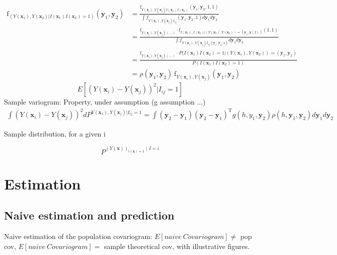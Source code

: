 \documentclass[12pt]{article}
\theoremstyle{definition}
\theoremstyle{remark}
\newcommand{\density}{\mathrm{f}}
\newcommand{\position}{\mathbf{x}}
\newcommand{\Signal}{Y}
\newcommand{\signal}{\mathbf{y}}
\begin{document}
\begin{equation}
\begin{split}
    \density_{(\Signal(\position_{1}),\Signal(\position_{2})|I(\position_1)I(\position_2)=1)}\left(\signal_1,\signal_2\right)&=\frac{\density_{Y(\position_{i}),\Signal(\position_{j})I(\position_1)I(\position_2)}(\signal_1,\signal_2,1,1)}{\int{f_{Y(\position_{i}),Y(\position_{j})I_{ij}}(\signal_{1},\signal_{2},1)}d \signal_{1}d \signal_{2}}\\
    &=\frac{\density_{\Signal(\position_{i}),\Signal(\position_{j})(\cdot,\cdot)}\cdot \density_{I(\position_1),I(\position_1)|(\Signal(\position_{1}),\Signal(\position_{2}))=(\signal_1,\signal(2))}(1,1)}{\int{f_{\Signal(\position_{i}),\Signal(\position_{j})I_{ij}(\signal_{1},\signal_{2},1)}d \signal_{1}d \signal_{2}}}\\
    &=\frac{\density_{\Signal(\position_{i}),\Signal(\position_{j})(\cdot,\cdot)}\cdot P(I(\position_1)I(\position_2)=1|(\Signal(\position_{1}),\Signal(\position_{2}))=(\signal_1,\signal_2)}{P(I(\position_1)I(\position_2)=1)}\\
    &=\rho(\signal_1,\signal_2)~\density_{\Signal(\position_{i}),\Signal(\position_{j})}(\signal_1,\signal_2) 
\end{split}
\end{equation}
\begin{equation}
    E[(\Signal(\position_{i})-\Signal(\position_{j}))^2|I_{ij}=1]
\end{equation}
Sample variogram: Property, under assumption (g assumption ...)
\begin{equation}
    \begin{split}
        \int{(\Signal(\position_{i})-\Signal(\position_{j}))^2dP^{\Signal(\position_{1}),\Signal(\position_{j})|I_{ij}=1}}=\int{\left(\signal_2-\signal_1\right)\left(\signal_2-\signal_1\right)^{\mathrm{T}}g(h,y_{1},\signal_{2})\rho(h,\signal_{1},\signal_{2})d \signal_{1} d \signal_{2}}
    \end{split}
\end{equation}

Sample distribution, for a given i

$$P^{(\Signal(\position))_{i(\position)=1}\mid I=i}$$



\section{Estimation}
\subsection{Naive estimation and prediction}
 Naive estimation of the population covariogram:
 $E[naive~Covariogram]\neq$ pop cov,
 $E[naive~Covariogram]=$ sample theoretical cov, 
 with illustrative figures.
\end{document}
